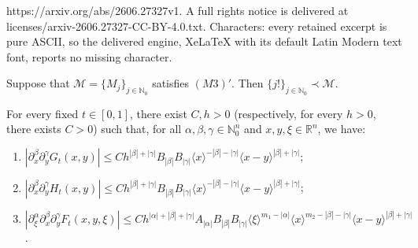 \documentclass[10pt,a4paper]{amsart}
\newcommand{\Mj}{{\{M_j\}_{j\in\mathbb{N}_0}}} %
\newcommand{\M}{{\mathcal{M}}} %
\newcommand{\N}{{\mathbb{N}}} %
\begin{document}
https://arxiv.org/abs/2606.27327v1. A full rights notice is delivered at licenses/arxiv-2606.27327-CC-BY-4.0.txt. Characters: every retained excerpt is pure ASCII, so the delivered engine, XeLaTeX with its default Latin Modern text font, reports no missing character.
\begin{proposition}\label{incl_quasi_factorial}
	Suppose that $\M=\Mj$ satisfies $(M3)'$. Then $\{j!\}_{j\in\N_0}\prec \M$.
\end{proposition}

\begin{lemma}\label{est_FGH}
	For every fixed $t\in[0,1]$, there exist $C,h>0$ 
	(respectively, for every $h>0$, there exists $C>0$) such that, for all $\alpha,\beta,\gamma\in\mathbb{N}_0^n$ and $x,y,\xi\in\mathbb{R}^n$, we have:
	\begin{enumerate}
		\item[(a)] $|\partial_x^\beta\partial_y^\gamma G_t(x,y)|\leq Ch^{|\beta|+|\gamma|}B_{|\beta|}B_{|\gamma|}\langle x\rangle^{-|\beta|-|\gamma|}\langle x-y\rangle^{|\beta|+|\gamma|}$;
		
		\item[(b)] $|\partial_x^\beta\partial_y^\gamma H_t(x,y)|\leq Ch^{|\beta|+|\gamma|}B_{|\beta|}B_{|\gamma|}\langle x\rangle^{-|\beta|-|\gamma|}\langle x-y\rangle^{|\beta|+|\gamma|}$;
		
		\item[(c)] $|\partial_\xi^\alpha\partial_x^\beta\partial_y^\gamma F_t(x,y,\xi)|\leq Ch^{|\alpha|+|\beta|+|\gamma|}A_{|\alpha|}B_{|\beta|}B_{|\gamma|} \langle\xi\rangle^{m_1-|\alpha|} \langle x\rangle^{m_2-|\beta|-|\gamma|}\langle x-y\rangle^{|\beta|+|\gamma|}$.
	\end{enumerate}
\end{lemma}
\end{document}
